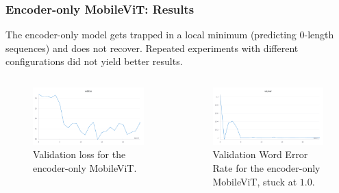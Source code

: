 \documentclass[english, xcolor={table}]{beamer}
\begin{document}
\begin{frame}
  \frametitle{Encoder-only MobileViT: Results}

  The encoder-only model gets trapped in a local minimum (predicting 0-length sequences) and does not recover. Repeated experiments with different configurations did \alert{not} yield better results.

  \begin{columns}
    \begin{column}{0.5\textwidth}
      \begin{figure}
        \centering
        \includegraphics[width=1\textwidth]{figures/loss_ctc.png}
        \caption{Validation loss for the encoder-only MobileViT.}
      \end{figure}
    \end{column}
    \begin{column}{0.5\textwidth}
      \begin{figure}
        \centering
        \includegraphics[width=1\textwidth]{figures/wer_ctc.png}
        \caption{Validation Word Error Rate for the encoder-only MobileViT, stuck at $1.0$.}
      \end{figure}
    \end{column}
  \end{columns}
\end{frame}
\end{document}
